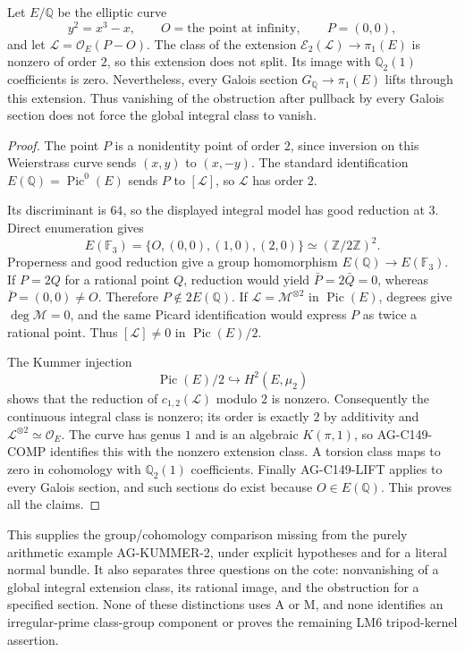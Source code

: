 \begin{proposition}
Let $E/\mathbb Q$ be the elliptic curve
\[
 y^2=x^3-x,
 \qquad O=\text{the point at infinity},\qquad P=(0,0),
\]
and let $\mathcal L=\mathcal O_E(P-O)$.
The class of the extension $\mathcal E_2(\mathcal L)\to\pi_1(E)$
is nonzero of order $2$, so this extension does not split. Its image
with $\mathbb Q_2(1)$ coefficients is zero. Nevertheless, every
Galois section $G_{\mathbb Q}\to\pi_1(E)$ lifts through this
extension. Thus vanishing of the obstruction after pullback by
every Galois section does not force the global integral class to
vanish.
\end{proposition}
\begin{proof}
The point $P$ is a nonidentity point of order $2$, since inversion on
this Weierstrass curve sends $(x,y)$ to $(x,-y)$. The standard
identification $E(\mathbb Q)=\operatorname{Pic}^0(E)$ sends $P$ to
$[\mathcal L]$, so $\mathcal L$ has order $2$.

Its discriminant is $64$, so the displayed integral model has good
reduction at $3$. Direct enumeration gives
\[
 E(\mathbb F_3)=\{O,(0,0),(1,0),(2,0)\}
                 \simeq(\mathbb Z/2\mathbb Z)^2.
\]
Properness and good reduction give a group homomorphism
$E(\mathbb Q)\to E(\mathbb F_3)$. If $P=2Q$ for a rational point
$Q$, reduction would yield $\bar P=2\bar Q=0$, whereas
$\bar P=(0,0)\ne O$. Therefore $P\notin2E(\mathbb Q)$.
If $\mathcal L=\mathcal M^{\otimes2}$ in $\operatorname{Pic}(E)$,
degrees give $\deg\mathcal M=0$, and the same Picard identification
would express $P$ as twice a rational point. Thus
$[\mathcal L]\ne0$ in $\operatorname{Pic}(E)/2$.

The Kummer injection
\[
 \operatorname{Pic}(E)/2\hookrightarrow H^2(E,\mu_2)
\]
shows that the reduction of $c_{1,2}(\mathcal L)$ modulo $2$ is
nonzero. Consequently the continuous integral class is nonzero;
its order is exactly $2$ by additivity and $\mathcal L^{\otimes2}
\simeq\mathcal O_E$. The curve has genus $1$ and is an algebraic
$K(\pi,1)$, so AG-C149-COMP identifies this with the nonzero
extension class. A torsion class maps to zero in cohomology with
$\mathbb Q_2(1)$ coefficients. Finally AG-C149-LIFT applies to
every Galois section, and such sections do exist because
$O\in E(\mathbb Q)$. This proves all the claims.
\end{proof}

This supplies the group/cohomology comparison missing from the purely
arithmetic example AG-KUMMER-2, under explicit hypotheses and for a
literal normal bundle. It also separates three questions on the cote:
nonvanishing of a global integral extension class, its rational image,
and the obstruction for a specified section. None of these distinctions
uses A or M, and none identifies an irregular-prime class-group
component or proves the remaining LM6 tripod-kernel assertion.

